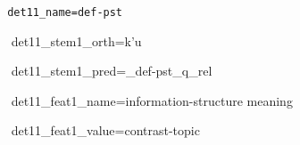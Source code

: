 \documentclass[a4paper]{article}
\begin{document}
{\small\tt
\xspace \xspace det11\_name=def-pst

\mbox{ } det11\_stem1\_orth=k'u\textipa{\ng}

\mbox{ } det11\_stem1\_pred=\_def-pst\_q\_rel 

\mbox{ } det11\_feat1\_name=information-structure meaning 

\mbox{ } det11\_feat1\_value=contrast-topic}
\end{document}
